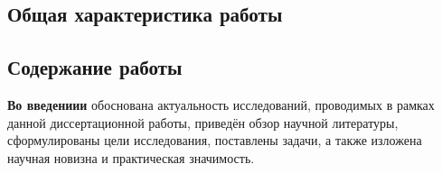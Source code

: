 
\setcounter{page}{1}

\begin{center}
\section*{Общая характеристика работы}
\end{center}

\newcommand{\actuality}{\pdfbookmark[1]{Актуальность}{actuality}\textbf{\actualityTXT}}
\newcommand{\progress}{\pdfbookmark[1]{Разработанность темы}{progress}\textbf{\progressTXT}}
\newcommand{\aim}{\pdfbookmark[1]{Цели}{aim}{\textbf\aimTXT}}
\newcommand{\tasks}{\pdfbookmark[1]{Задачи}{tasks}\textbf{\tasksTXT}}
\newcommand{\aimtasks}{\pdfbookmark[1]{Цели и задачи}{aimtasks}\aimtasksTXT}
\newcommand{\novelty}{\pdfbookmark[1]{Научная новизна}{novelty}\textbf{\noveltyTXT}}
\newcommand{\influence}{\pdfbookmark[1]{Практическая значимость}{influence}\textbf{\influenceTXT}}
\newcommand{\methods}{\pdfbookmark[1]{Методология и методы исследования}{methods}\textbf{\methodsTXT}}
\newcommand{\defpositions}{\pdfbookmark[1]{Положения, выносимые на защиту}{defpositions}\textbf{\defpositionsTXT}}
\newcommand{\reliability}{\pdfbookmark[1]{Достоверность}{reliability}\textbf{\reliabilityTXT}}
\newcommand{\probation}{\pdfbookmark[1]{Апробация}{probation}\textbf{\probationTXT}}
\newcommand{\contribution}{\pdfbookmark[1]{Личный вклад}{contribution}\textbf{\contributionTXT}}
\newcommand{\publications}{\pdfbookmark[1]{Публикации}{publications}\textbf{\publicationsTXT}}




\begin{center}
\section*{Содержание работы}
\end{center}
\textbf{Во введениии} обоснована актуальность исследований, проводимых в рамках данной диссертационной работы, приведён обзор научной литературы, сформулированы цели исследования, поставлены задачи, а также изложена научная новизна и практическая значимость.

